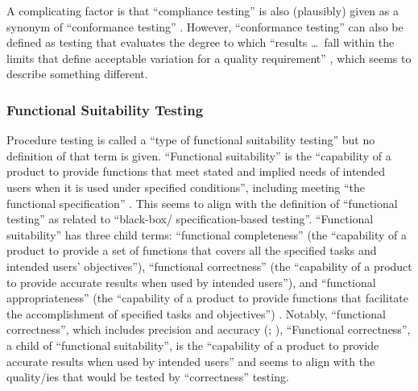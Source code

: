 A complicating factor is that ``compliance testing'' is also
(plausibly) given as a synonym of ``conformance testing''
\citep[p.~43]{Kam2008}. However, ``conformance
testing'' can also be defined as testing that evaluates the degree
to which ``results \dots\ fall within the limits that define
acceptable variation for a quality requirement''
\citep[p.~93]{IEEE2017}, which seems to
describe something different.


\subsubsection{Functional Suitability Testing}
Procedure testing is
called a ``type of functional suitability testing''
\citep[p.~7]{IEEE2022} but no definition of that term is given.
``Functional suitability'' is the
``capability of a product to provide functions that meet stated and
implied needs of intended users when it is used under specified
conditions'', including meeting ``the functional specification''
\citep{ISO_IEC2023a}. This seems to align with the definition of
``functional testing'' as related to ``black-box/%
specification-based testing''.
\ifnotpaper
    ``Functional suitability'' has
    three child terms: ``functional completeness'' (the ``capability of
    a product to provide a set of functions that covers all the
    specified tasks and intended users' objectives''), ``functional
    correctness'' (the ``capability of a product to provide accurate
    results when used by intended users''), and ``functional
    appropriateness'' (the ``capability of a product to provide
    functions that facilitate the accomplishment of specified tasks and
    objectives'') \citep{ISO_IEC2023a}. Notably, ``functional
    correctness'', which includes precision and accuracy
    (\citealp{ISO_IEC2023a}; \citealpISTQB{}), \else ``Functional
    correctness'', a child of ``functional suitability'', is the ``capability
    of a product to provide accurate results when used by intended users''
    \cite{ISO_IEC2023a} and \fi seems to align with
the quality/ies that would be tested by ``correctness'' testing.

